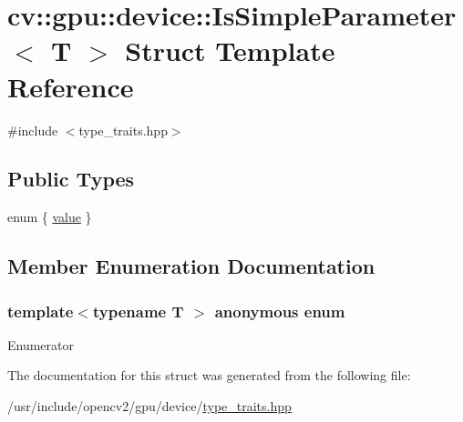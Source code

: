 \hypertarget{structcv_1_1gpu_1_1device_1_1IsSimpleParameter}{\section{cv\-:\-:gpu\-:\-:device\-:\-:Is\-Simple\-Parameter$<$ T $>$ Struct Template Reference}
\label{structcv_1_1gpu_1_1device_1_1IsSimpleParameter}
}


{\ttfamily \#include $<$type\-\_\-traits.\-hpp$>$}

\subsection*{Public Types}
\begin{DoxyCompactItemize}
\item 
enum \{ \hyperlink{structcv_1_1gpu_1_1device_1_1IsSimpleParameter_a745e3cf80f7b43fa45eadd9b38fd4001ae1cc34ece7cd14d2ee3e9b58fc5f3ac7}{value}
 \}
\end{DoxyCompactItemize}


\subsection{Member Enumeration Documentation}
\hypertarget{structcv_1_1gpu_1_1device_1_1IsSimpleParameter_a745e3cf80f7b43fa45eadd9b38fd4001}{\subsubsection[{anonymous enum}]{\setlength{\rightskip}{0pt plus 5cm}template$<$typename T $>$ anonymous enum}}\label{structcv_1_1gpu_1_1device_1_1IsSimpleParameter_a745e3cf80f7b43fa45eadd9b38fd4001}
\begin{Desc}
\item[Enumerator]\par
\begin{description}
\item[{\em 
\hypertarget{structcv_1_1gpu_1_1device_1_1IsSimpleParameter_a745e3cf80f7b43fa45eadd9b38fd4001ae1cc34ece7cd14d2ee3e9b58fc5f3ac7}{value}\label{structcv_1_1gpu_1_1device_1_1IsSimpleParameter_a745e3cf80f7b43fa45eadd9b38fd4001ae1cc34ece7cd14d2ee3e9b58fc5f3ac7}
}]\end{description}
\end{Desc}


The documentation for this struct was generated from the following file\-:\begin{DoxyCompactItemize}
\item 
/usr/include/opencv2/gpu/device/\hyperlink{type__traits_8hpp}{type\-\_\-traits.\-hpp}\end{DoxyCompactItemize}
